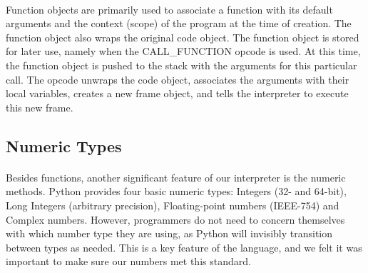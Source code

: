 \documentclass{article}
\begin{document}
\paragraph{}
Function objects are primarily used to associate a function with its default arguments and the context (scope) of the program at the time of creation. The function object also wraps the original code object. The function object is stored for later use, namely when the CALL\_FUNCTION opcode is used. At this time, the function object is pushed to the stack with the arguments for this particular call. The opcode unwraps the code object, associates the arguments with their local variables, creates a new frame object, and tells the interpreter to execute this new frame.

\subsection{Numeric Types} \label{numeric}

\paragraph{}
Besides functions, another significant feature of our interpreter is the numeric methods. Python provides four basic numeric types: Integers (32- and 64-bit), Long Integers (arbitrary precision), Floating-point numbers (IEEE-754) and Complex numbers. However, programmers do not need to concern themselves with which number type they are using, as Python will invisibly transition between types as needed. This is a key feature of the language, and we felt it was important to make sure our numbers met this standard.
\end{document}
